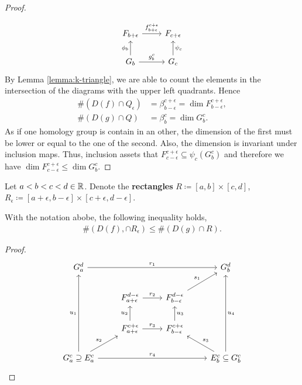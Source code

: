 \begin{proof}
\begin{align}
    \end{align}
    \begin{equation} \label{cd:quadrant-2}
    \begin{tikzcd}
        F_{b+\epsilon} \arrow[r, "f_{b+\epsilon}^{c+\epsilon}"]
        & F_{c+\epsilon} \\
        G_b \arrow[r, "g_b^c"] \arrow[u, "\phi_{b}"]
        & G_c \arrow[u, "\psi_c"']        
    \end{tikzcd}
    \end{equation}
    By Lemma \ref{lemma:k-triangle}, we are able to count the elements in the intersection of the diagrams with the upper left quadrants. Hence
    \begin{align}
        \#(D(f) \cap Q_\epsilon) &= \beta_{b-\epsilon}^{c+\epsilon} = \dim F_{b-\epsilon}^{c+\epsilon}, \\
        \#(D(g) \cap Q) &= \beta_b^c = \dim G_b^c.
    \end{align}
    As if one homology group is contain in an other, the dimension of the first must be lower or equal to the one of the second. Also, the dimension is invariant under inclusion maps. Thus, inclusion \label{eq:quadrant-3} assets that $ F_{c-\epsilon}^{c+\epsilon} \subseteq \psi_c (G_b^c) $ and therefore we have $ \dim F_{c-\epsilon}^{c+\epsilon} \leq  \dim G_b^c $.
\end{proof}

Let $ a < b < c < d \in \mathbb R $. Denote the {\bf rectangles} $ R \coloneq [a, b] \times [c, d] $, $ R_\epsilon \coloneq [a+\epsilon, b-\epsilon] \times [c+\epsilon, d -\epsilon] $.

\begin{lemma} \label{lemma:box-lemma}
    With the notation abobe, the following inequality holds,
    \begin{align}
        \#(D(f), \cap R_\epsilon) \leq \#(D(g) \cap R).
    \end{align}
\end{lemma}
\begin{proof}
    $$
    \begin{tikzcd}
        G_a^d \arrow[rrr, "r_1"]
        &
        &
        & G_b^d \\
        & F_{a+\epsilon}^{d-\epsilon} \arrow[r, "r_2"]
        & F_{b-\epsilon}^{d-\epsilon} \arrow[ru, "s_1"]
        & \\
                                                                                      & F_{a+\epsilon}^{c+\epsilon} \arrow[u, "u_2"] \arrow[r, "r_3"] & F_{b-\epsilon}^{c+\epsilon} \arrow[u, "u_3"'] &                                                              \\
        G_a^c \supseteq E_a^c \arrow[ru, "s_2"] \arrow[uuu, "u_1"] \arrow[rrr, "r_4"] &                                                               &                                               & E_b^c \subseteq G_b^c \arrow[lu, "s_3"'] \arrow[uuu, "u_4"']
        \end{tikzcd}
    $$
\end{proof}

